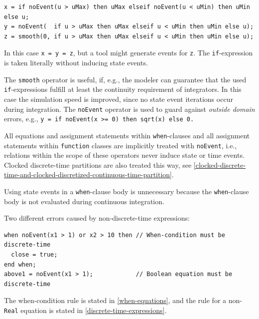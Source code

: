 \begin{example}
\begin{lstlisting}[language=modelica]
x = if noEvent(u > uMax) then uMax elseif noEvent(u < uMin) then uMin else u;
y = noEvent(  if u > uMax then uMax elseif u < uMin then uMin else u);
z = smooth(0, if u > uMax then uMax elseif u < uMin then uMin else u);
\end{lstlisting}

In this case \lstinline!x = y = z!, but a tool might generate events for \lstinline!z!.
The \lstinline!if!-expression is taken literally without inducing state events.

The \lstinline!smooth! operator is useful, if, e.g., the modeler can guarantee that the used \lstinline!if!-expressions fulfill at least the continuity requirement of integrators.
In this case the simulation speed is improved, since no state event iterations occur during integration.
The \lstinline!noEvent! operator is used to guard against \emph{outside domain} errors, e.g., \lstinline!y = if noEvent(x >= 0) then sqrt(x) else 0.!
\end{example}

All equations and assignment statements within \lstinline!when!-clauses and all assignment statements within \lstinline!function! classes are implicitly treated with \lstinline!noEvent!, i.e., relations within the scope of these operators never induce state or time events.
Clocked discrete-time partitions are also treated this way, see \cref{clocked-discrete-time-and-clocked-discretized-continuous-time-partition}.

\begin{nonnormative}
Using state events in a \lstinline!when!-clause body is unnecessary because the \lstinline!when!-clause body is not evaluated during continuous integration.
\end{nonnormative}

\begin{example}
Two different errors caused by non-discrete-time expressions:
\begin{lstlisting}[language=modelica]
when noEvent(x1 > 1) or x2 > 10 then // When-condition must be discrete-time
  close = true;
end when;
above1 = noEvent(x1 > 1);            // Boolean equation must be discrete-time
\end{lstlisting}
The when-condition rule is stated in \cref{when-equations}, and the rule for a non-\lstinline!Real! equation is stated in \cref{discrete-time-expressions}.
\end{example}

